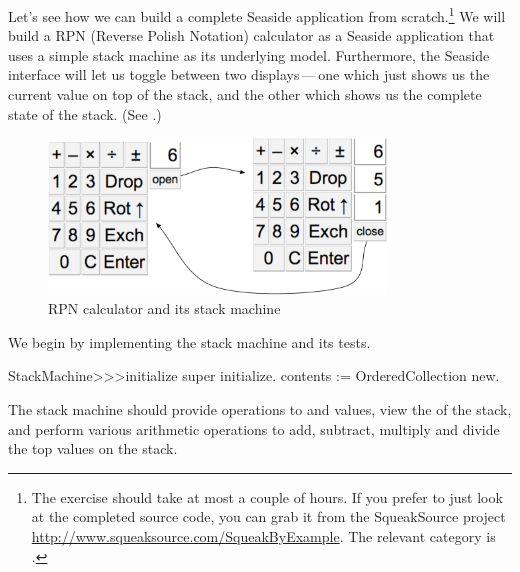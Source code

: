 \documentclass[a4paper,10pt,twoside]{book}
\begin{document}

Let's see how we can build a complete Seaside application from scratch.\footnote{The exercise should take at most a couple of hours. If you prefer to just look at the completed source code, you can grab it from the SqueakSource project \url{http://www.squeaksource.com/SqueakByExample}.
The relevant category is .}
We will build a RPN (Reverse Polish Notation) calculator as a Seaside application that uses a simple stack machine as its underlying model.
Furthermore, the Seaside interface will let us toggle between two displays\,---\,one which just shows us the current value on top of the stack, and the other which shows us the complete state of the stack.
(See .)

\begin{figure}[ht]
\begin{center}
\includegraphics[width=0.8\textwidth]{stackMachine}
\caption{RPN calculator and its stack machine}
\label{fig:stackMachine}
\end{center}
\end{figure}

We begin by implementing the stack machine and its tests.


\begin{code}{}
StackMachine>>>initialize
	super initialize.
	contents := OrderedCollection new.
\end{code}

The stack machine should provide operations to  and  values, view the  of the stack, and perform various arithmetic operations to add, subtract, multiply and divide the top values on the stack.

\end{document}
